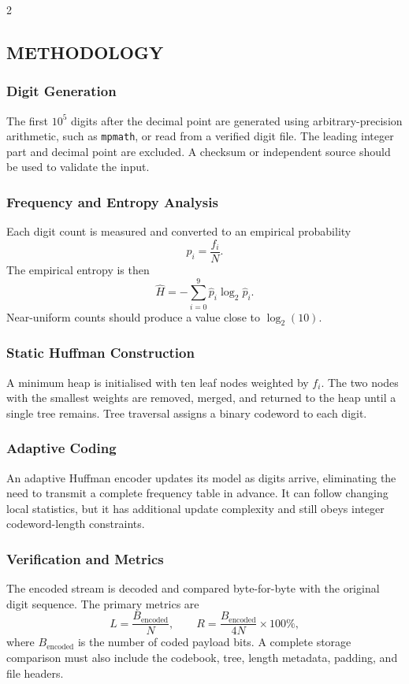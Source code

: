 \begin{multicols}{2}
  \subsection*{\centering\uppercase{Methodology}}
  \subsubsection*{Digit Generation}
  The first $10^5$ digits after the decimal point are generated using arbitrary-precision arithmetic, such as \texttt{mpmath}, or read from a verified digit file. The leading integer part and decimal point are excluded. A checksum or independent source should be used to validate the input.

  \subsubsection*{Frequency and Entropy Analysis}
  Each digit count is measured and converted to an empirical probability
  \[
    \hat{p}_i=\frac{f_i}{N}.
  \]
  The empirical entropy is then
  \[
    \hat{H}=-\sum_{i=0}^{9}\hat{p}_i\log_2\hat{p}_i.
  \]
  Near-uniform counts should produce a value close to $\log_2(10)$.

  \subsubsection*{Static Huffman Construction}
  A minimum heap is initialised with ten leaf nodes weighted by $f_i$. The two nodes with the smallest weights are removed, merged, and returned to the heap until a single tree remains. Tree traversal assigns a binary codeword to each digit.

  \subsubsection*{Adaptive Coding}
  An adaptive Huffman encoder updates its model as digits arrive, eliminating the need to transmit a complete frequency table in advance. It can follow changing local statistics, but it has additional update complexity and still obeys integer codeword-length constraints.

  \subsubsection*{Verification and Metrics}
  The encoded stream is decoded and compared byte-for-byte with the original digit sequence. The primary metrics are
  \[
    L=\frac{B_{\mathrm{encoded}}}{N}, \qquad
    R=\frac{B_{\mathrm{encoded}}}{4N}\times100\%,
  \]
  where $B_{\mathrm{encoded}}$ is the number of coded payload bits. A complete storage comparison must also include the codebook, tree, length metadata, padding, and file headers.


\end{multicols}

